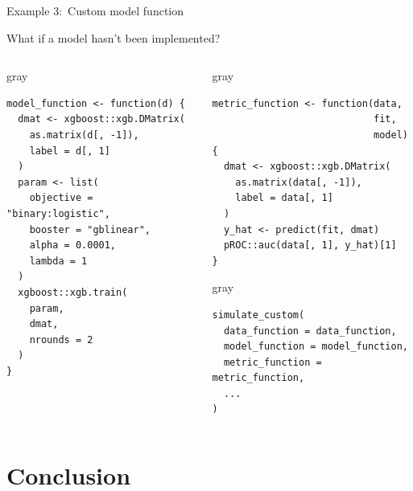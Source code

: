 \documentclass[11pt]{beamer}
\begin{document}
\begin{frame}[c,fragile]{Example 3:\ Custom model function}

	What if a model hasn't been implemented?%
    \vspace{-0.5em}%

	\begin{columns}
		\begin{column}[T]{0.5\textwidth}
			\begin{cbox}{gray}{}%
				\begin{verbatim}
model_function <- function(d) {
  dmat <- xgboost::xgb.DMatrix(
    as.matrix(d[, -1]),
    label = d[, 1]
  )
  param <- list(
    objective = "binary:logistic",
    booster = "gblinear",
    alpha = 0.0001,
    lambda = 1
  )
  xgboost::xgb.train(
    param,
    dmat,
    nrounds = 2
  )
}
            \end{verbatim}
			\end{cbox}

		\end{column}
		\begin{column}[T]{0.55\textwidth}
			\begin{cbox}{gray}{}%
				\begin{verbatim}
metric_function <- function(data,
                            fit,
                            model) {
  dmat <- xgboost::xgb.DMatrix(
    as.matrix(data[, -1]), 
    label = data[, 1]
  )
  y_hat <- predict(fit, dmat)
  pROC::auc(data[, 1], y_hat)[1]
}
            \end{verbatim}
			\end{cbox}

			\begin{cbox}{gray}{}%
				\begin{verbatim}
simulate_custom(
  data_function = data_function,
  model_function = model_function,
  metric_function = metric_function,
  ...
)
            \end{verbatim}
			\end{cbox}
		\end{column}
	\end{columns}

\end{frame}

\section{Conclusion}
\end{document}
